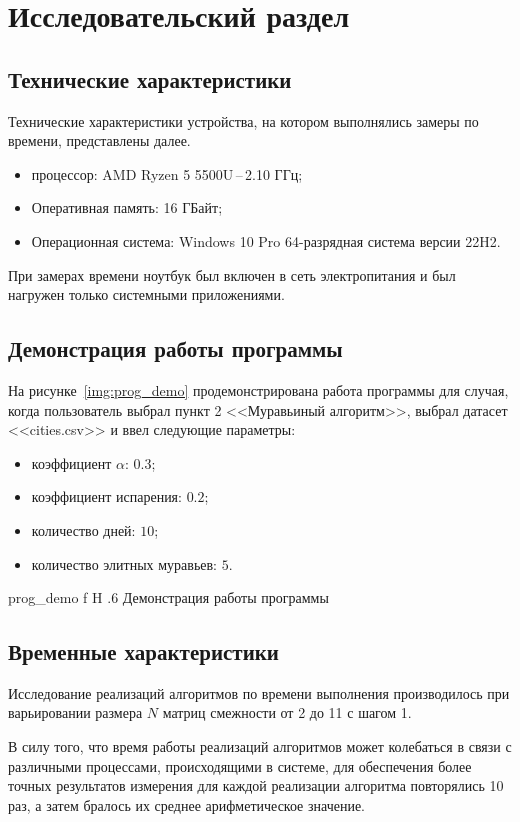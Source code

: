 \chapter{Исследовательский раздел}

\section{Технические характеристики}
Технические характеристики устройства, на котором выполнялись замеры по времени, представлены далее.
\begin{itemize}
	\item процессор: AMD Ryzen 5 5500U\,--\,2.10 ГГц;
	\item Оперативная память: 16 ГБайт;
	\item Операционная система: Windows 10 Pro 64-разрядная система версии 22H2.
\end{itemize}

При замерах времени ноутбук был включен в сеть электропитания и был нагружен только системными приложениями.

\section{Демонстрация работы программы}

На рисунке~\ref{img:prog_demo} продемонстрирована работа программы для случая, когда пользователь выбрал пункт 2 <<Муравьиный алгоритм>>, выбрал датасет <<cities.csv>> и ввел следующие параметры:
\begin{itemize}
	\item коэффициент $\alpha$: $0.3$;
	\item коэффициент испарения: $0.2$;
	\item количество дней: $10$;
	\item количество элитных муравьев: $5$.
\end{itemize}

{prog_demo}
{f}
{H}
{.6\textwidth}
{Демонстрация работы программы}

\section{Временные характеристики}

Исследование реализаций алгоритмов по времени выполнения производилось при варьировании размера $N$ матриц смежности от 2 до 11 с шагом 1.

В силу того, что время работы реализаций алгоритмов может колебаться в связи с различными процессами, происходящими в системе, для обеспечения более точных результатов измерения для каждой реализации алгоритма повторялись 10 раз, а затем бралось их среднее арифметическое значение.

